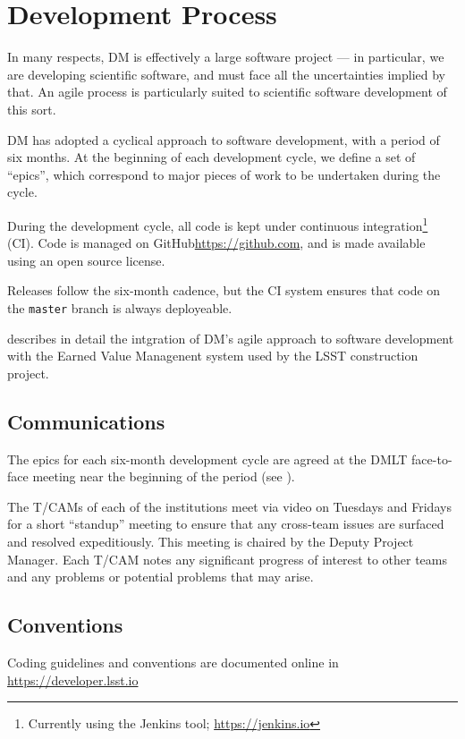 \section{Development Process} \label{sect:devproc}

In many respects, DM is effectively a large software project --- in particular, we are developing scientific software, and must face all the uncertainties implied by that.
An agile process \citep{it:agile} is particularly suited to scientific
software development of this sort.

DM has adopted a cyclical approach to software development, with a period of six months.
At the beginning of each development cycle, we define a set of ``epics'', which correspond to major pieces of work to be undertaken during the cycle.

During the development cycle, all code is kept under continuous integration\footnote{Currently using the Jenkins tool; \url{https://jenkins.io}} (CI).
Code is managed on GitHub\url{https://github.com}, and is made available using an open source license.

Releases follow the six-month cadence, but the CI system ensures that code on the \texttt{master} branch is always deployeable.

 describes in detail the intgration of DM's agile approach to software development with the Earned Value Managenent system used by the LSST construction project.

\subsection{Communications}

The epics for each six-month development cycle are agreed at the DMLT face-to-face meeting near the beginning of the period (see ).

The T/CAMs of each of the institutions meet via video on Tuesdays and Fridays for a short ``standup'' meeting to ensure that any cross-team issues are surfaced and resolved expeditiously.
This meeting is chaired by the Deputy Project Manager.
Each T/CAM notes any significant progress of interest to other teams and any problems or potential problems that may arise.

\subsection{Conventions}
Coding guidelines and conventions are documented online in \url{https://developer.lsst.io}


